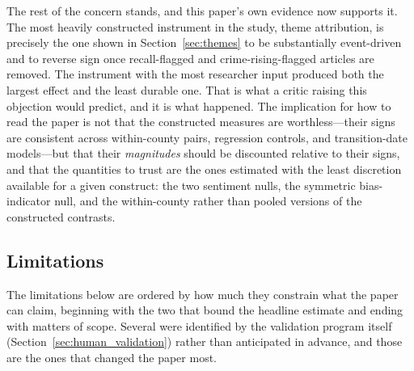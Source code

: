 \documentclass[12pt, letterpaper]{article}
\begin{document}
The rest of the concern stands, and this paper's own evidence now supports it. The most heavily constructed instrument in the study, theme attribution, is precisely the one shown in Section~\ref{sec:themes} to be substantially event-driven and to reverse sign once recall-flagged and crime-rising-flagged articles are removed. The instrument with the most researcher input produced both the largest effect and the least durable one. That is what a critic raising this objection would predict, and it is what happened. The implication for how to read the paper is not that the constructed measures are worthless---their signs are consistent across within-county pairs, regression controls, and transition-date models---but that their \emph{magnitudes} should be discounted relative to their signs, and that the quantities to trust are the ones estimated with the least discretion available for a given construct: the two sentiment nulls, the symmetric bias-indicator null, and the within-county rather than pooled versions of the constructed contrasts.

\subsection{Limitations}
\label{sec:limitations}

The limitations below are ordered by how much they constrain what the paper can claim, beginning with the two that bound the headline estimate and ending with matters of scope. Several were identified by the validation program itself (Section~\ref{sec:human_validation}) rather than anticipated in advance, and those are the ones that changed the paper most.
\end{document}

